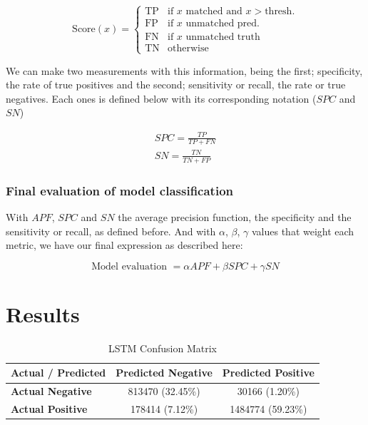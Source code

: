 \documentclass{article}
\begin{document}
\[
\text{Score}(x) = 
\begin{cases} 
\text{TP} & \text{if }x \text{ matched and } x > \text{thresh.} \\
\text{FP} & \text{if }x \text{ unmatched pred.} \\
\text{FN} & \text{if }x \text{ unmatched truth} \\
\text{TN} & \text{otherwise}
\end{cases}
\]

We can make two measurements with this information, being the first; specificity, the rate of true positives and the second; sensitivity or recall, the rate or true negatives. Each ones is defined below with its corresponding notation ($SPC$ and $SN$)

\begin{gather}
  SPC = \frac{TP}{TP + FN} \\
  SN = \frac{TN}{TN + FP}
\end{gather}

\subsubsection{Final evaluation of model classification}

With $APF$, $SPC$ and $SN$ the average precision function, the specificity and the sensitivity or recall, as defined before. And with $\alpha$, $\beta$, $\gamma$ values that weight each metric, we have our final expression as described here:

\begin{equation*}
\text{Model evaluation } = \alpha APF + \beta SPC + \gamma SN 
\end{equation*}

\vspace{.5em}



\section{Results}


\begin{table}[h]
    \centering
    \caption{LSTM Confusion Matrix}
    \label{tab:lstm_confusion_matrix}
    \begin{tabular}{lcc}
        \hline
        \textbf{Actual / Predicted} & \textbf{Predicted Negative} & \textbf{Predicted Positive} \\
        \hline
        \textbf{Actual Negative} & 813470 (32.45\%) & 30166 (1.20\%) \\
        \textbf{Actual Positive} & 178414 (7.12\%) & 1484774 (59.23\%) \\
        \hline
    \end{tabular}
\end{table}
\end{document}
